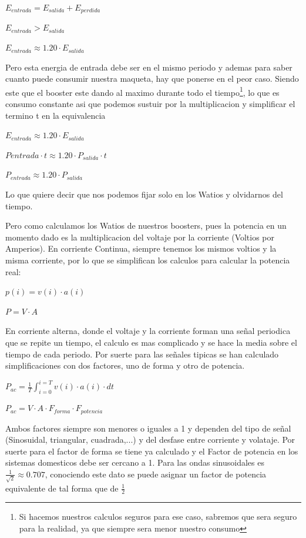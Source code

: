 $E_{entrada} = E_{salida} + E_{perdida}$

$E_{entrada} > E_{salida}$

$E_{entrada} \approx 1.20 \cdot E_{salida}$

Pero esta energia de entrada debe ser en el mismo periodo y ademas para saber cuanto puede consumir nuestra maqueta, hay que ponerse en el peor caso. Siendo este que el booster este dando al maximo durante todo el tiempo\footnote{Si hacemos nuestros calculos seguros para ese caso, sabremos que sera seguro para la realidad, ya que siempre sera menor nuestro consumo}, lo que es consumo constante asi que podemos sustuir por la multiplicacion y simplificar el termino t en la equivalencia

$E_{entrada} \approx 1.20 \cdot E_{salida}$

$P{entrada}\cdot t \approx 1.20 \cdot P_{salida} \cdot t$

$P_{entrada} \approx 1.20 \cdot P_{salida}$

Lo que quiere decir que nos podemos fijar solo en los Watios y olvidarnos del tiempo.

Pero como calculamos los Watios de nuestros boosters, pues la potencia en un momento dado es la multiplicacion del voltaje por la corriente (Voltios por Amperios). En corriente Continua, siempre tenemos los mismos voltios y la misma corriente, por lo que se simplifican los calculos para calcular la potencia real:

$p(i) = v(i) \cdot a(i)$

$P = V \cdot A$

En corriente alterna, donde el voltaje y la corriente forman una señal periodica que se repite un tiempo, el calculo es mas complicado y se hace la media sobre el tiempo de cada periodo. Por suerte para las señales tipicas se han calculado simplificaciones con dos factores, uno de forma y otro de potencia.

$ P_{ac} =\frac{1}{T} \int_{i=0}^{i=T}{v(i)\cdot a(i)\cdot dt}$

$ P_{ac} = V \cdot A \cdot F_{forma} \cdot F_{potencia} $

Ambos factores siempre son menores o iguales a 1 y dependen del tipo de señal (Sinosuidal, triangular, cuadrada,...) y del desfase entre corriente y volataje. Por suerte para el factor de forma se tiene ya calculado y el Factor de potencia en los sistemas domesticos debe ser cercano a 1. Para las ondas sinusoidales es $\frac{1}{\sqrt{2}} \approx 0.707$, conociendo este dato se puede asignar un factor de potencia equivalente de tal forma que de $\frac{1}{2}$

